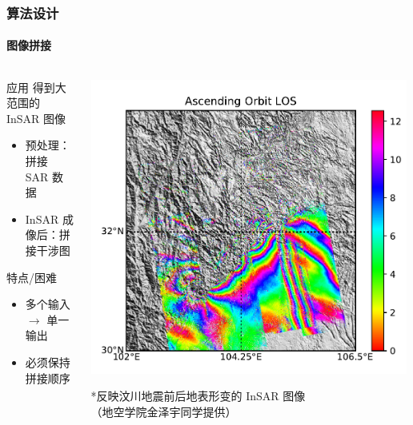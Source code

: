\documentclass{beamer}
\begin{document}
\begin{frame}
    \frametitle{算法设计}
    \framesubtitle{图像拼接}

    \begin{columns}
        \begin{column}{0.5\textwidth}
            \begin{block}{应用}
                \small
                得到大范围的 InSAR 图像
                \begin{itemize}
                    \item 预处理：拼接 SAR 数据
                    \item InSAR 成像后：拼接干涉图
                \end{itemize}
            \end{block}
            \begin{block}{特点/困难}
                \small
                \begin{itemize}
                    \item 多个输入 $\to$ 单一输出
                    \item 必须保持拼接顺序
                \end{itemize}
            \end{block}
        \end{column}
        \begin{column}{0.5\textwidth}
            \centering
            \includegraphics[width=0.99\textwidth]{figures/wenchuan.png}
            \begin{tiny}
            *反映汶川地震前后地表形变的 InSAR 图像 \\
            （地空学院金泽宇同学提供）
            \end{tiny}
        \end{column}
    \end{columns}
\end{frame}
\end{document}
